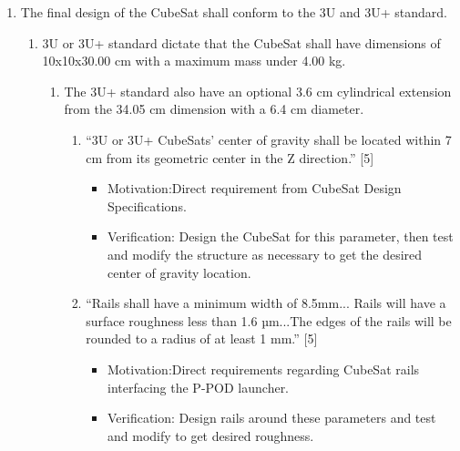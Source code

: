 \documentclass{ece}
\begin{document}
\renewcommand{\labelenumi}{\theenumi}
\renewcommand{\labelenumii}{\theenumii}
\renewcommand{\labelenumiii}{\theenumiii}
\renewcommand{\labelenumiv}{\theenumiv}
\renewcommand{\theenumi}{\textbf{FR.\arabic{enumi}}}
\renewcommand{\theenumii}{\textbf{DR.\arabic{enumi}.\arabic{enumii}}}
\renewcommand{\theenumiii}{\textbf{DR.\arabic{enumi}.\arabic{enumii}.\arabic{enumiii}}}
\renewcommand{\theenumiv}{\textbf{DR.\arabic{enumi}.\arabic{enumii}.\arabic{enumiii}.\arabic{enumiv}}}

\begin{enumerate} %
    \item The final design of the CubeSat shall conform to the 3U and 3U+ standard.
    \begin{enumerate}
        \item 3U or 3U+ standard dictate that the CubeSat shall have dimensions of 10x10x30.00 cm with a maximum mass under 4.00 kg.
        \begin{enumerate}
            \item The 3U+ standard also have an optional 3.6 cm cylindrical extension from the 34.05 cm dimension with a 6.4 cm diameter.  
            \begin{enumerate}
                \item “3U or 3U+ CubeSats’ center of gravity shall be located within 7 cm from its geometric center in the Z direction.” [5]  
                \begin{itemize}
                    \item Motivation:Direct requirement from CubeSat Design Specifications. 
                    \item Verification: Design the CubeSat for this parameter, then test and modify the structure as necessary to get the desired center of gravity location. 
                \end{itemize}
                \item “Rails shall have a minimum width of 8.5mm... Rails will have a surface roughness less than 1.6 µm...The edges of the rails will be rounded to a radius of at least 1 mm.” [5] 
                \begin{itemize}
                    \item Motivation:Direct requirements regarding CubeSat rails interfacing the P-POD launcher.  
                    \item Verification: Design rails around these parameters and test and modify to get desired roughness. 
                \end{itemize}
            \end{enumerate}
        \end{enumerate}


\end{enumerate}
\end{enumerate}
\end{document}

